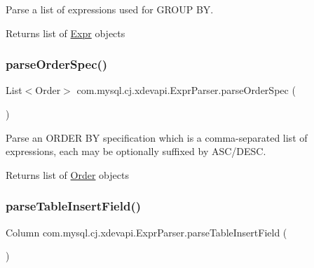 Parse a list of expressions used for G\+R\+O\+UP BY.

\begin{DoxyReturn}{Returns}
list of \mbox{\hyperlink{}{Expr}} objects 
\end{DoxyReturn}
\mbox{\label{classcom_1_1mysql_1_1cj_1_1xdevapi_1_1_expr_parser_aa948ecc19739c733f80c170943ce53fe}} 
\subsubsection{\texorpdfstring{parse\+Order\+Spec()}{parseOrderSpec()}}
{\footnotesize\ttfamily List$<$Order$>$ com.\+mysql.\+cj.\+xdevapi.\+Expr\+Parser.\+parse\+Order\+Spec (\begin{DoxyParamCaption}{ }\end{DoxyParamCaption})}

Parse an O\+R\+D\+ER BY specification which is a comma-\/separated list of expressions, each may be optionally suffixed by A\+S\+C/\+D\+E\+SC.

\begin{DoxyReturn}{Returns}
list of \mbox{\hyperlink{}{Order}} objects 
\end{DoxyReturn}
\mbox{\label{classcom_1_1mysql_1_1cj_1_1xdevapi_1_1_expr_parser_a2c759e26260efb3a807ea8ca178d7f55}} 
\subsubsection{\texorpdfstring{parse\+Table\+Insert\+Field()}{parseTableInsertField()}}
{\footnotesize\ttfamily Column com.\+mysql.\+cj.\+xdevapi.\+Expr\+Parser.\+parse\+Table\+Insert\+Field (\begin{DoxyParamCaption}{ }\end{DoxyParamCaption})}

